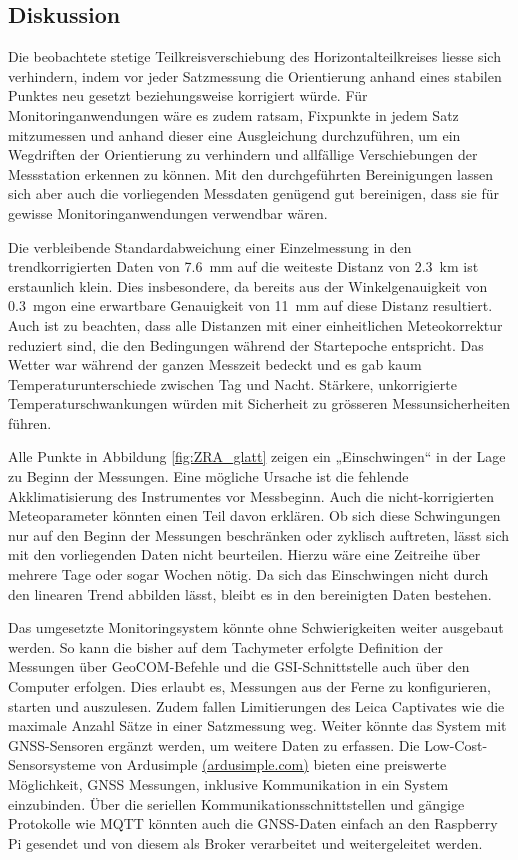 \subsection{Diskussion}
Die beobachtete stetige Teilkreisverschiebung des Horizontalteilkreises liesse sich verhindern, indem vor jeder 
Satzmessung die Orientierung anhand eines stabilen Punktes neu gesetzt beziehungsweise korrigiert würde. Für Monitoringanwendungen 
wäre es zudem ratsam, Fixpunkte in jedem Satz mitzumessen und anhand dieser eine Ausgleichung durchzuführen, um ein Wegdriften 
der Orientierung zu verhindern und allfällige Verschiebungen der Messstation erkennen zu können. Mit den durchgeführten 
Bereinigungen lassen sich aber auch die vorliegenden Messdaten genügend gut bereinigen, dass sie für gewisse Monitoringanwendungen 
verwendbar wären. 

Die verbleibende Standardabweichung einer Einzelmessung in den trendkorrigierten Daten von 7.6~mm auf die 
weiteste Distanz von 2.3~km ist erstaunlich klein. Dies insbesondere, da bereits aus der Winkelgenauigkeit von 0.3~mgon eine erwartbare 
Genauigkeit von 11~mm auf diese Distanz resultiert. Auch ist zu beachten, dass alle Distanzen mit einer einheitlichen Meteokorrektur 
reduziert sind, die den Bedingungen während der Startepoche entspricht. Das Wetter war während der ganzen Messzeit bedeckt und es 
gab kaum Temperaturunterschiede zwischen Tag und Nacht. Stärkere, unkorrigierte Temperaturschwankungen würden mit Sicherheit zu 
grösseren Messunsicherheiten führen.

Alle Punkte in Abbildung \ref{fig:ZRA_glatt} zeigen ein „Einschwingen“ in der Lage zu Beginn der Messungen. 
Eine mögliche Ursache ist die fehlende Akklimatisierung des Instrumentes vor Messbeginn. Auch die nicht-korrigierten 
Meteoparameter könnten einen Teil davon erklären. Ob sich diese Schwingungen nur auf den Beginn der Messungen beschränken oder 
zyklisch auftreten, lässt sich mit den vorliegenden Daten nicht beurteilen. Hierzu wäre eine Zeitreihe über mehrere Tage oder sogar 
Wochen nötig. Da sich das Einschwingen nicht durch den linearen Trend abbilden lässt, bleibt es in den bereinigten Daten bestehen. 

Das umgesetzte Monitoringsystem könnte ohne Schwierigkeiten weiter ausgebaut werden. So kann die bisher auf dem Tachymeter erfolgte 
Definition der Messungen über GeoCOM-Befehle und die GSI-Schnittstelle auch über den Computer erfolgen. Dies erlaubt es, Messungen 
aus der Ferne zu konfigurieren, starten und auszulesen. Zudem fallen Limitierungen des Leica Captivates wie die maximale Anzahl Sätze 
in einer Satzmessung weg. Weiter könnte das System mit GNSS-Sensoren ergänzt werden, um weitere Daten zu erfassen. Die Low-Cost-Sensorsysteme 
von Ardusimple \href{https://ardusimple.com}{(ardusimple.com)} bieten eine preiswerte Möglichkeit, GNSS Messungen, inklusive Kommunikation in ein System einzubinden. 
Über die seriellen Kommunikationsschnittstellen und gängige Protokolle wie MQTT könnten auch die GNSS-Daten einfach an den Raspberry Pi 
gesendet und von diesem als Broker verarbeitet und weitergeleitet werden.

\FloatBarrier